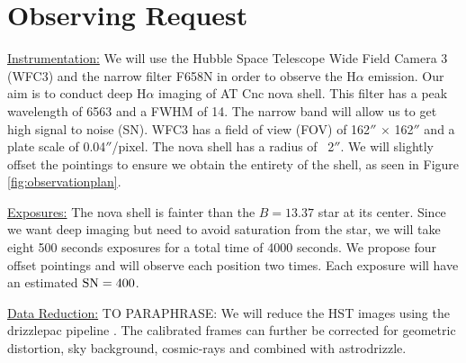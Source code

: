 \documentclass[11pt,a4paper]{article}  %
\begin{document}





\section{Observing Request}
\underline{Instrumentation:}
We will use the Hubble Space Telescope Wide Field Camera 3 (WFC3) and the narrow filter F658N in order to observe the H$\alpha$ emission. Our aim is to conduct deep H$\alpha$ imaging of AT Cnc nova shell. This filter has a peak wavelength of 6563 and a FWHM of 14. The narrow band will allow us to get high signal to noise (SN). WFC3 has a field of view (FOV) of 162$''$ $\times$ 162$''$ and a plate scale of 0.04$''$/pixel. The nova shell has a radius of ~2$''$. We will slightly offset the pointings to ensure we obtain the entirety of the shell, as seen in Figure \ref{fig:observationplan}. 
\vspace{1mm} \
 \par \noindent \underline{Exposures:} The nova shell is fainter than the $B=13.37$ star at its center. Since we want deep imaging but need to avoid saturation from the star, we will take eight 500 seconds exposures for a total time of 4000 seconds. We propose four offset pointings and will observe each position two times. Each exposure will have an estimated $\rm SN=400$. 
 \vspace{1mm} \
 \par \noindent \underline{Data Reduction:} 
TO PARAPHRASE: We will reduce the
HST images using the drizzlepac pipeline \cite{Avila2015}. The calibrated frames can further be corrected for
geometric distortion, sky background, cosmic-rays and
combined with astrodrizzle. 
\end{document}
